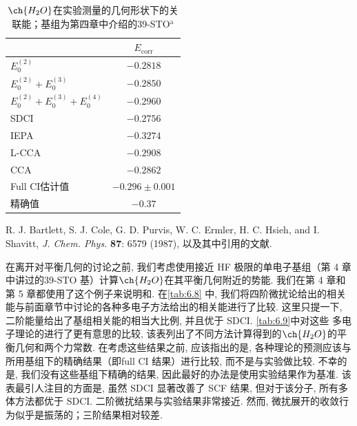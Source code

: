 \begin{table}
	\centering
        \caption{$\ch{H_2O}$在实验测量的几何形状下的关联能；基组为第四章中介绍的39-STO$^\text{a}$}
	\begin{threeparttable}
		\begin{tabular}{l@{\hspace{2.5cm}}c}
			\hline & \multicolumn{1}{c}{$E_{\text {corr}}$} \\
			\hline$E_0^{(2)}$ & $-0.2818$ \\
			$E_0^{(2)}+E_0^{(3)}$ & $-0.2850$ \\
			$E_0^{(2)}+E_0^{(3)}+E_0^{(4)}$ & $-0.2960$ \\
			SDCI & $-0.2756$ \\
			IEPA & $-0.3274$ \\
			L-CCA & $-0.2908$ \\
			CCA & $-0.2862$ \\
			Full CI估计值 & $-0.296 \pm 0.001$ \\
			精确值 & $-0.37$ \\
			\hline
		\end{tabular}
	\begin{tablenotes}
		\item[a] R. J. Bartlett, S. J. Cole, G. D. Purvis, W. C. Ermler, H. C. Hsieh, and I. Shavitt, \textit{J. Chem. Phys.} \textbf{87}: 6579 (1987), 以及其中引用的文献. 
	\end{tablenotes}
	\end{threeparttable}
	\label{tab:6.8}
\end{table}

在离开对平衡几何的讨论之前, 我们考虑使用接近 HF 极限的单电子基组（第 4 章中讲过的39-STO 基）计算$\ch{H_2O}$在其平衡几何附近的势能.  
我们在第 4 章和第 5 章都使用了这个例子来说明和.  
在\autoref{tab:6.8} 中, 我们将四阶微扰论给出的相关能与前面章节中讨论的各种多电子方法给出的相关能进行了比较.  
这里只提一下, 二阶能量给出了基组相关能的相当大比例, 并且优于 SDCI. \autoref{tab:6.9}中对这些
多电子理论的进行了更有意思的比较, 该表列出了不同方法计算得到的$\ch{H_2O}$的平衡几何和两个力常数.  
在考虑这些结果之前, 应该指出的是, 各种理论的预测应该与所用基组下的精确结果（即full CI 结果）进行比较, 而不是与实验做比较.  
不幸的是, 我们没有这些基组下精确的结果, 因此最好的办法是使用实验结果作为基准.  
该表最引人注目的方面是, 虽然 SDCI 显著改善了 SCF 结果, 但对于该分子, 所有多体方法都优于 SDCI.  
二阶微扰结果与实验结果非常接近.  然而, 微扰展开的收敛行为似乎是振荡的；三阶结果相对较差. 

